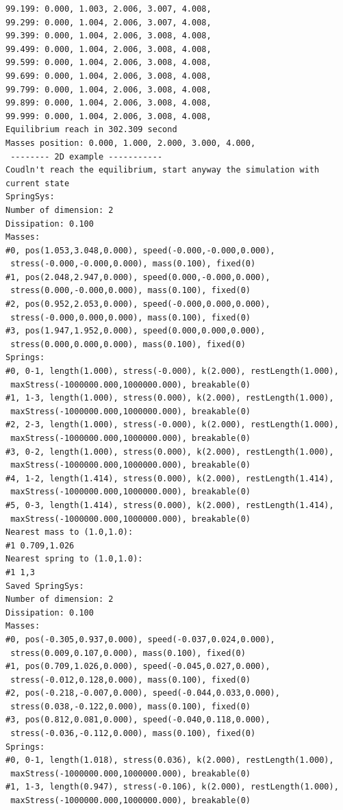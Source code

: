 \documentclass[12pt, a4paper]{article}
\begin{document}
\begin{scriptsize}
\begin{ttfamily}
\begin{lstlisting}
99.199: 0.000, 1.003, 2.006, 3.007, 4.008, 
99.299: 0.000, 1.004, 2.006, 3.007, 4.008, 
99.399: 0.000, 1.004, 2.006, 3.008, 4.008, 
99.499: 0.000, 1.004, 2.006, 3.008, 4.008, 
99.599: 0.000, 1.004, 2.006, 3.008, 4.008, 
99.699: 0.000, 1.004, 2.006, 3.008, 4.008, 
99.799: 0.000, 1.004, 2.006, 3.008, 4.008, 
99.899: 0.000, 1.004, 2.006, 3.008, 4.008, 
99.999: 0.000, 1.004, 2.006, 3.008, 4.008, 
Equilibrium reach in 302.309 second
Masses position: 0.000, 1.000, 2.000, 3.000, 4.000, 
 -------- 2D example -----------
Coudln't reach the equilibrium, start anyway the simulation with current state
SpringSys:
Number of dimension: 2
Dissipation: 0.100
Masses:
#0, pos(1.053,3.048,0.000), speed(-0.000,-0.000,0.000),
 stress(-0.000,-0.000,0.000), mass(0.100), fixed(0)
#1, pos(2.048,2.947,0.000), speed(0.000,-0.000,0.000),
 stress(0.000,-0.000,0.000), mass(0.100), fixed(0)
#2, pos(0.952,2.053,0.000), speed(-0.000,0.000,0.000),
 stress(-0.000,0.000,0.000), mass(0.100), fixed(0)
#3, pos(1.947,1.952,0.000), speed(0.000,0.000,0.000),
 stress(0.000,0.000,0.000), mass(0.100), fixed(0)
Springs:
#0, 0-1, length(1.000), stress(-0.000), k(2.000), restLength(1.000),
 maxStress(-1000000.000,1000000.000), breakable(0)
#1, 1-3, length(1.000), stress(0.000), k(2.000), restLength(1.000),
 maxStress(-1000000.000,1000000.000), breakable(0)
#2, 2-3, length(1.000), stress(-0.000), k(2.000), restLength(1.000),
 maxStress(-1000000.000,1000000.000), breakable(0)
#3, 0-2, length(1.000), stress(0.000), k(2.000), restLength(1.000),
 maxStress(-1000000.000,1000000.000), breakable(0)
#4, 1-2, length(1.414), stress(0.000), k(2.000), restLength(1.414),
 maxStress(-1000000.000,1000000.000), breakable(0)
#5, 0-3, length(1.414), stress(0.000), k(2.000), restLength(1.414),
 maxStress(-1000000.000,1000000.000), breakable(0)
Nearest mass to (1.0,1.0):
#1 0.709,1.026
Nearest spring to (1.0,1.0):
#1 1,3
Saved SpringSys:
Number of dimension: 2
Dissipation: 0.100
Masses:
#0, pos(-0.305,0.937,0.000), speed(-0.037,0.024,0.000),
 stress(0.009,0.107,0.000), mass(0.100), fixed(0)
#1, pos(0.709,1.026,0.000), speed(-0.045,0.027,0.000),
 stress(-0.012,0.128,0.000), mass(0.100), fixed(0)
#2, pos(-0.218,-0.007,0.000), speed(-0.044,0.033,0.000),
 stress(0.038,-0.122,0.000), mass(0.100), fixed(0)
#3, pos(0.812,0.081,0.000), speed(-0.040,0.118,0.000),
 stress(-0.036,-0.112,0.000), mass(0.100), fixed(0)
Springs:
#0, 0-1, length(1.018), stress(0.036), k(2.000), restLength(1.000),
 maxStress(-1000000.000,1000000.000), breakable(0)
#1, 1-3, length(0.947), stress(-0.106), k(2.000), restLength(1.000),
 maxStress(-1000000.000,1000000.000), breakable(0)

\end{lstlisting}
\end{ttfamily}
\end{scriptsize}
\end{document}
